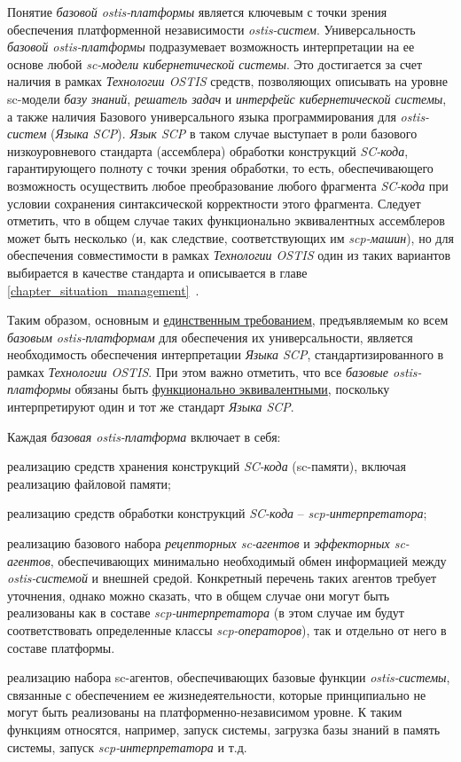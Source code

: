 Понятие \textit{базовой ostis-платформы} является ключевым с точки зрения обеспечения платформенной независимости \textit{ostis-систем}. Универсальность \textit{базовой ostis-платформы} подразумевает возможность интерпретации на ее основе любой \textit{sc-модели кибернетической системы}. Это достигается за счет наличия в рамках \textit{Технологии OSTIS} средств, позволяющих описывать на уровне sc-модели \textit{базу знаний}, \textit{решатель задач} и \textit{интерфейс кибернетической системы}, а также наличия Базового универсального языка программирования для \textit{ostis-систем} (\textit{Языка SCP}). \textit{Язык SCP} в таком случае выступает в роли базового низкоуровневого стандарта (ассемблера) обработки конструкций \textit{SC-кода}, гарантирующего полноту с точки зрения обработки, то есть, обеспечивающего возможность осуществить любое преобразование любого фрагмента \textit{SC-кода} при условии сохранения синтаксической корректности этого фрагмента. Следует отметить, что в общем случае таких функционально эквивалентных ассемблеров может быть несколько (и, как следствие, соответствующих им \textit{scp-машин}), но для обеспечения совместимости в рамках \textit{Технологии OSTIS} один из таких вариантов выбирается в качестве стандарта и описывается в главе \ref{chapter_situation_management}~. 

Таким образом, основным и \uline{единственным требованием}, предъявляемым ко всем \textit{базовым ostis-платформам} для обеспечения их универсальности, является необходимость обеспечения интерпретации \textit{Языка SCP}, стандартизированного в рамках \textit{Технологии OSTIS}. При этом важно отметить, что все \textit{базовые ostis-платформы} обязаны быть \uline{функционально эквивалентными}, поскольку интерпретируют один и тот же стандарт \textit{Языка SCP}.

Каждая \textit{базовая ostis-платформа} включает в себя:
\begin{textitemize}
	\item реализацию средств хранения конструкций \textit{SC-кода} (sc-памяти), включая реализацию файловой памяти;
	\item реализацию средств обработки конструкций \textit{SC-кода} -- \textit{scp-интерпретатора};
	\item реализацию базового набора \textit{рецепторных sc-агентов} и \textit{эффекторных sc-агентов}, обеспечивающих минимально необходимый обмен информацией между \textit{ostis-системой} и внешней средой. Конкретный перечень таких агентов требует уточнения, однако можно сказать, что в общем случае они могут быть реализованы как в составе \textit{scp-интерпретатора} (в этом случае им будут соответствовать определенные классы \textit{scp-операторов}), так и отдельно от него в составе платформы.
	\item реализацию набора sc-агентов, обеспечивающих базовые функции \textit{ostis-системы}, связанные с обеспечением ее жизнедеятельности, которые принципиально не могут быть реализованы на платформенно-независимом уровне. К таким функциям относятся, например, запуск системы, загрузка базы знаний в память системы, запуск \textit{scp-интерпретатора} и т.д.
\end{textitemize}

